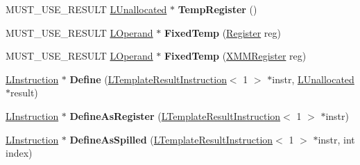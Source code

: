 \begin{DoxyCompactItemize}
\item 
M\+U\+S\+T\+\_\+\+U\+S\+E\+\_\+\+R\+E\+S\+U\+LT \hyperlink{classv8_1_1internal_1_1_l_unallocated}{L\+Unallocated} $\ast$ {\bfseries Temp\+Register} ()\hypertarget{classv8_1_1internal_1_1_l_chunk_builder_a4ba4ae71849e93fc59cb527dce3dbeea}{}\label{classv8_1_1internal_1_1_l_chunk_builder_a4ba4ae71849e93fc59cb527dce3dbeea}

\item 
M\+U\+S\+T\+\_\+\+U\+S\+E\+\_\+\+R\+E\+S\+U\+LT \hyperlink{classv8_1_1internal_1_1_l_operand}{L\+Operand} $\ast$ {\bfseries Fixed\+Temp} (\hyperlink{structv8_1_1internal_1_1_register}{Register} reg)\hypertarget{classv8_1_1internal_1_1_l_chunk_builder_a0e9a78fbc1b87c8a44c721e93143b26e}{}\label{classv8_1_1internal_1_1_l_chunk_builder_a0e9a78fbc1b87c8a44c721e93143b26e}

\item 
M\+U\+S\+T\+\_\+\+U\+S\+E\+\_\+\+R\+E\+S\+U\+LT \hyperlink{classv8_1_1internal_1_1_l_operand}{L\+Operand} $\ast$ {\bfseries Fixed\+Temp} (\hyperlink{structv8_1_1internal_1_1_double_register}{X\+M\+M\+Register} reg)\hypertarget{classv8_1_1internal_1_1_l_chunk_builder_a7ea6f4f9c364d73519c40ed66550b24b}{}\label{classv8_1_1internal_1_1_l_chunk_builder_a7ea6f4f9c364d73519c40ed66550b24b}

\item 
\hyperlink{classv8_1_1internal_1_1_l_instruction}{L\+Instruction} $\ast$ {\bfseries Define} (\hyperlink{classv8_1_1internal_1_1_l_template_result_instruction}{L\+Template\+Result\+Instruction}$<$ 1 $>$ $\ast$instr, \hyperlink{classv8_1_1internal_1_1_l_unallocated}{L\+Unallocated} $\ast$result)\hypertarget{classv8_1_1internal_1_1_l_chunk_builder_afd009a30c72fe37dd1b35d4241854ca0}{}\label{classv8_1_1internal_1_1_l_chunk_builder_afd009a30c72fe37dd1b35d4241854ca0}

\item 
\hyperlink{classv8_1_1internal_1_1_l_instruction}{L\+Instruction} $\ast$ {\bfseries Define\+As\+Register} (\hyperlink{classv8_1_1internal_1_1_l_template_result_instruction}{L\+Template\+Result\+Instruction}$<$ 1 $>$ $\ast$instr)\hypertarget{classv8_1_1internal_1_1_l_chunk_builder_af4f9a5078553b1f743899df249a25b31}{}\label{classv8_1_1internal_1_1_l_chunk_builder_af4f9a5078553b1f743899df249a25b31}

\item 
\hyperlink{classv8_1_1internal_1_1_l_instruction}{L\+Instruction} $\ast$ {\bfseries Define\+As\+Spilled} (\hyperlink{classv8_1_1internal_1_1_l_template_result_instruction}{L\+Template\+Result\+Instruction}$<$ 1 $>$ $\ast$instr, int index)\hypertarget{classv8_1_1internal_1_1_l_chunk_builder_a4e42c6b4bb935cc879f078e349ee6a1d}{}\label{classv8_1_1internal_1_1_l_chunk_builder_a4e42c6b4bb935cc879f078e349ee6a1d}


\end{DoxyCompactItemize}
